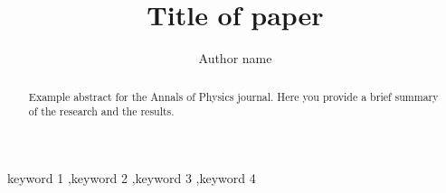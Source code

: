\documentclass[final,5p,times,twocolumn,authoryear]{elsarticle}
\begin{document}
\begin{frontmatter}



\title{Title of paper}


\author[first]{Author name}

\begin{abstract}
Example abstract for the Annals of Physics journal. Here you provide a brief summary of the research and the results.
\end{abstract}



\begin{keyword}
keyword 1 \sep keyword 2 \sep keyword 3 \sep keyword 4



\end{keyword}


\end{frontmatter}
\end{document}
